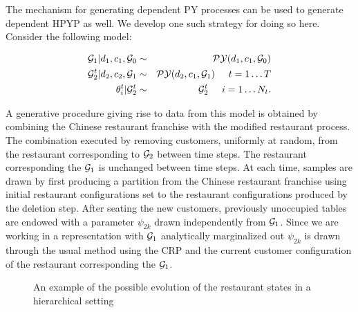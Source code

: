 The mechanism for generating dependent PY processes can be used to generate dependent HPYP as well.  We develop one such strategy for doing so here.  Consider the following model: 

\begin{eqnarray*}
\G_1 | d_1, c_1, \G_0 &\sim& \PY(d_1, c_1, \G_0)\\
\G_2^t | d_2, c_2, \G_1&\sim& \PY(d_2, c_1, \G_1) \hspace{.5cm} t = 1\dots T\\
\theta^t_i | \G_2^t &\sim& \G_2^t \hspace{.5cm} i = 1\dots N_t.
\end{eqnarray*}

A generative procedure giving rise to data from this model is obtained by combining the Chinese restaurant franchise with the modified restaurant process.  The combination executed by removing customers, uniformly at random, from the restaurant corresponding to $\G_2$ between time steps.  The restaurant corresponding the $\G_1$ is unchanged between time steps. At each time, samples are drawn by first producing a partition from the Chinese restaurant franchise using initial restaurant configurations set to the restaurant configurations produced by the deletion step.  After seating the new customers,  previously unoccupied tables are endowed with a parameter $\psi_{2k}$ drawn independently from $\G_1$.  Since we are working in a representation with $\G_1$ analytically marginalized out $\psi_{2k}$ is drawn through the usual method using the CRP and the current customer configuration of the restaurant corresponding the $\G_1$.


\begin{figure}[h!tbp] 
	\begin{center}
		\caption{An example of the possible evolution of the restaurant states in a hierarchical setting}
		\label{figVHPY}
	\end{center} 
\end{figure} 

